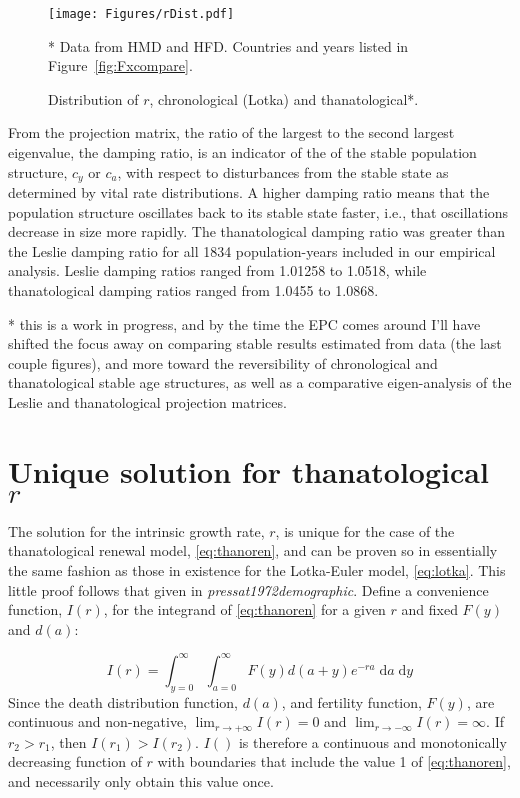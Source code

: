 \documentclass{article}
\newcommand{\dd}{\; \mathrm{d}}
\begin{document}
\begin{figure}[h!]
	\caption{Distribution of $r$, chronological (Lotka) and thanatological*.}
	\begin{center}
		\label{fig:rDist}
		\texttt{[image: Figures/rDist.pdf]}
	\end{center}
	\begin{tiny}
     * Data from HMD and HFD. Countries and years listed in
     Figure~\ref{fig:Fxcompare}.
	\end{tiny}
\end{figure}

From the projection matrix, the ratio of the largest to the second largest
eigenvalue, the damping ratio, is an indicator of the  of the
stable population structure, $c_y$ or $c_a$, with respect to disturbances from the stable state
as determined by vital rate distributions. A higher damping ratio means that the
population structure oscillates back to its stable state faster, i.e., that
oscillations decrease in size more rapidly. The thanatological damping ratio was
greater than the Leslie damping ratio for all 1834 population-years included in
our empirical analysis. Leslie damping ratios ranged from 1.01258 to 1.0518,
while thanatological damping ratios ranged from 1.0455 to 1.0868.

* this is a work in progress, and by the time the EPC comes around I'll
have shifted the focus away on comparing stable results estimated from data
(the last couple figures), and more toward the reversibility of chronological
and thanatological stable age structures, as well as a comparative
eigen-analysis of the Leslie and thanatological projection matrices.

\vspace{2em}

\appendix
\section{Unique solution for thanatological $r$}
\label{app:A}
The solution for the intrinsic growth rate, $r$, is unique for the case of the
thanatological renewal model, \eqref{eq:thanoren}, and can be proven so in
essentially the same fashion as those in existence for the Lotka-Euler model,
\eqref{eq:lotka}. This little proof follows that given in
\textit{pressat1972demographic}. Define a convenience function, $I(r)$, for the
integrand of \eqref{eq:thanoren} for a given $r$ and fixed $F(y)$ and $d(a)$:

\begin{equation}
I(r) = \int_{y=0}^\infty \int_{a=0}^\infty F(y) d(a+y)e^{-ra}\dd a \dd y
\end{equation}
Since the death distribution function, $d(a)$, and fertility
function, $F(y)$, are continuous and non-negative, $\lim_{r \to +\infty} I(r)
= 0$ and $\lim_{r \to -\infty} I(r)= \infty$. If $r_2 > r_1$, then $I(r_1) >
I(r_2)$. $I()$ is therefore a continuous and monotonically decreasing function
of $r$ with boundaries that include the value 1 of \eqref{eq:thanoren}, and
 necessarily only obtain this value once.

\nocite{HMD,HFD}

    
\end{document}
